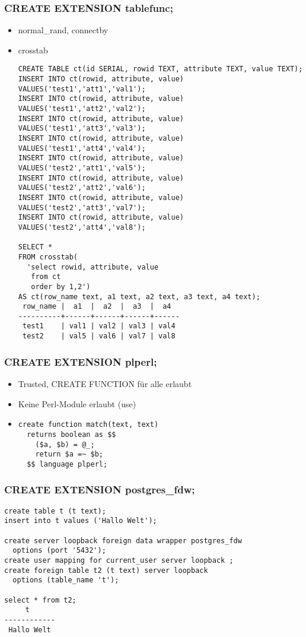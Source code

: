 \documentclass[utf8,hyperref={pdftex,colorlinks,linkcolor=black,citecolor=black,urlcolor=black,filecolor=black,plainpages=false},xcolor=table,hyperref]{beamer}
\begin{document}
\begin{frame}[containsverbatim]
	\frametitle{CREATE EXTENSION tablefunc;}
	\begin{itemize}
		\item normal_rand, connectby
		\item crosstab
			{\scriptsize
			\begin{verbatim}
CREATE TABLE ct(id SERIAL, rowid TEXT, attribute TEXT, value TEXT);
INSERT INTO ct(rowid, attribute, value) VALUES('test1','att1','val1');
INSERT INTO ct(rowid, attribute, value) VALUES('test1','att2','val2');
INSERT INTO ct(rowid, attribute, value) VALUES('test1','att3','val3');
INSERT INTO ct(rowid, attribute, value) VALUES('test1','att4','val4');
INSERT INTO ct(rowid, attribute, value) VALUES('test2','att1','val5');
INSERT INTO ct(rowid, attribute, value) VALUES('test2','att2','val6');
INSERT INTO ct(rowid, attribute, value) VALUES('test2','att3','val7');
INSERT INTO ct(rowid, attribute, value) VALUES('test2','att4','val8');

SELECT *
FROM crosstab(
  'select rowid, attribute, value
   from ct
   order by 1,2')
AS ct(row_name text, a1 text, a2 text, a3 text, a4 text);
 row_name |  a1  |  a2  |  a3  |  a4  
----------+------+------+------+------
 test1    | val1 | val2 | val3 | val4
 test2    | val5 | val6 | val7 | val8
 \end{verbatim}}
	\end{itemize}
\end{frame}

\begin{frame}[containsverbatim]
	\frametitle{CREATE EXTENSION plperl;}
	\begin{itemize}
		\item Trusted, CREATE FUNCTION für alle erlaubt
		\item Keine Perl-Module erlaubt (use)
		\item \begin{verbatim}
create function match(text, text)
  returns boolean as $$
    ($a, $b) = @_;
    return $a =~ $b;
  $$ language plperl;
\end{verbatim}
\end{itemize}
\end{frame}

\begin{frame}[containsverbatim]
	\frametitle{CREATE EXTENSION postgres_fdw;}
	\begin{verbatim}
create table t (t text);
insert into t values ('Hallo Welt');

create server loopback foreign data wrapper postgres_fdw
  options (port '5432');
create user mapping for current_user server loopback ;
create foreign table t2 (t text) server loopback
  options (table_name 't');

select * from t2;
     t      
------------
 Hallo Welt
\end{verbatim}
\end{frame}
\end{document}
